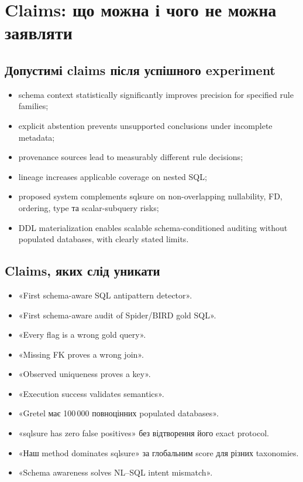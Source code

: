 \documentclass[11pt,a4paper]{article}
\begin{document}
\section{Claims: що можна і чого не можна заявляти}

\subsection{Допустимі claims після успішного experiment}

\begin{itemize}
\item schema context statistically significantly improves precision for specified
      rule families;
\item explicit abstention prevents unsupported conclusions under incomplete metadata;
\item provenance sources lead to measurably different rule decisions;
\item lineage increases applicable coverage on nested SQL;
\item proposed system complements sqlsure on non-overlapping nullability, FD, ordering,
      type та scalar-subquery risks;
\item DDL materialization enables scalable schema-conditioned auditing without
      populated databases, with clearly stated limits.
\end{itemize}

\subsection{Claims, яких слід уникати}

\begin{riskbox}
\begin{itemize}
\item «First schema-aware SQL antipattern detector».
\item «First schema-aware audit of Spider/BIRD gold SQL».
\item «Every flag is a wrong gold query».
\item «Missing FK proves a wrong join».
\item «Observed uniqueness proves a key».
\item «Execution success validates semantics».
\item «Gretel має 100\,000 повноцінних populated databases».
\item «sqlsure has zero false positives» без відтворення його exact protocol.
\item «Наш method dominates sqlsure» за глобальним score для різних taxonomies.
\item «Schema awareness solves NL--SQL intent mismatch».
\end{itemize}
\end{riskbox}
\end{document}
